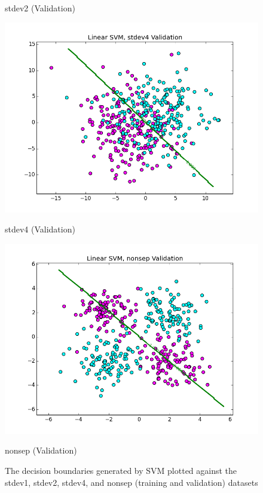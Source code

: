\documentclass[10pt]{article}
\begin{document}
\begin{figure}[ht]
\begin{minipage}[b]{.24\linewidth}
		\caption*{stdev2 (Validation)}
	\end{minipage}
	\begin{minipage}[b]{.24\linewidth}
		\centering
		\includegraphics[width=.5\linewidth, height=.5in]{linear_svm_stdev4_validation.png}
		\caption*{stdev4 (Validation)}
	\end{minipage}
	\begin{minipage}[b]{.24\linewidth}
		\centering
		\includegraphics[width=.5\linewidth, height=.5in]{linear_svm_nonsep_validation.png}
		\caption*{nonsep (Validation)}
	\end{minipage}
	\caption{The decision boundaries generated by SVM plotted against the stdev1, stdev2, stdev4, and nonsep (training and validation) datasets}
\end{figure}
\end{document}
